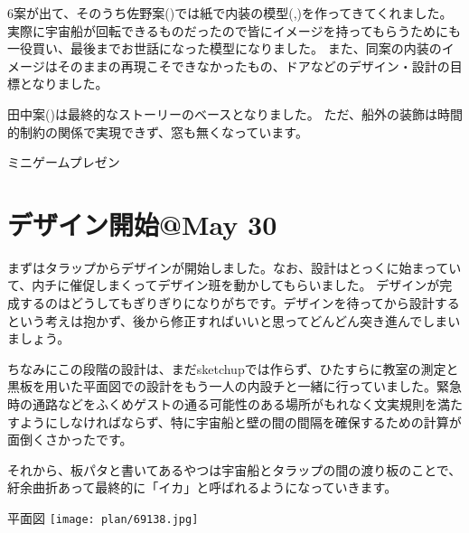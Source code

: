 \documentclass[uplatex,dvipdfmx]{jsreport}
\begin{document}
6案が出て、そのうち佐野案()では紙で内装の模型(,)を作ってきてくれました。
実際に宇宙船が回転できるものだったので皆にイメージを持ってもらうためにも一役買い、最後までお世話になった模型になりました。
また、同案の内装のイメージはそのままの再現こそできなかったもの、ドアなどのデザイン・設計の目標となりました。

田中案()は最終的なストーリーのベースとなりました。
ただ、船外の装飾は時間的制約の関係で実現できず、窓も無くなっています。

\begin{imageHere}{ミニゲームプレゼン}
    \vspace{-35mm}
\end{imageHere}

\clearpage

\section{デザイン開始@May 30}
まずはタラップからデザインが開始しました。なお、設計はとっくに始まっていて、内チに催促しまくってデザイン班を動かしてもらいました。
デザインが完成するのはどうしてもぎりぎりになりがちです。デザインを待ってから設計するという考えは抱かず、後から修正すればいいと思ってどんどん突き進んでしまいましょう。

ちなみにこの段階の設計は、まだsketchupでは作らず、ひたすらに教室の測定と黒板を用いた平面図での設計をもう一人の内設チと一緒に行っていました。緊急時の通路などをふくめゲストの通る可能性のある場所がもれなく文実規則を満たすようにしなければならず、特に宇宙船と壁の間の間隔を確保するための計算が面倒くさかったです。

それから、板パタと書いてあるやつは宇宙船とタラップの間の渡り板のことで、紆余曲折あって最終的に「イカ」と呼ばれるようになっていきます。

\begin{imageHere}{平面図}
    \texttt{[image: plan/69138.jpg]}
\end{imageHere}
\end{document}
